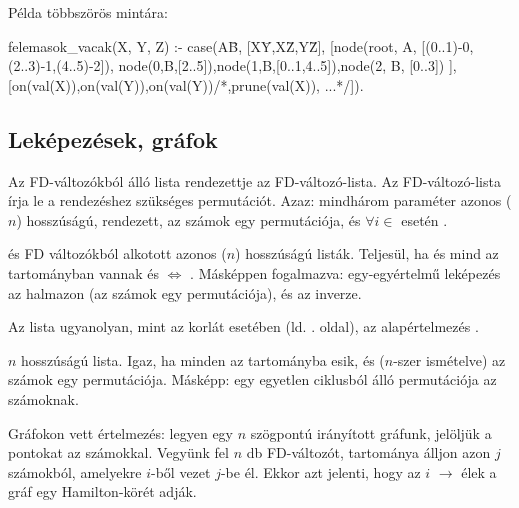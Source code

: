 Példa többszörös mintára: 

\begin{prologcode}
felemasok_vacak(X, Y, Z) :-
    case(A\=B, [X\=Y,X\=Z,Y\=Z],
     [node(root, A, [(0..1)-0,(2..3)-1,(4..5)-2]),
      node(0,B,[2..5]),node(1,B,[0..1,4..5]),node(2, B, [0..3])
     ], [on(val(X)),on(val(Y)),on(val(Y))/*,prune(val(X)), ...*/]).
\end{prologcode}

\subsection{Leképezések, gráfok}

{}

Az  FD-változókból álló lista rendezettje az  FD-változó-lista. Az 
FD-változó-lista írja le a rendezéshez szükséges permutációt. Azaz: mindhárom
paraméter azonos ($n$) hosszúságú,  rendezett,  az  számok
egy permutációja, és $\forall i \in$  esetén .

\medskip

{}

 és  FD változókból alkotott azonos ($n$) hosszúságú listák. Teljesül,
ha  és  mind az  tartományban vannak és 
$\Leftrightarrow$ . Másképpen fogalmazva:  egy-egyértelmű
leképezés az  halmazon (az  számok egy permutációja), és
 az  inverze.

Az  lista ugyanolyan, mint az  korlát
esetében (ld. \pageref{all_distinct}. oldal), az alapértelmezés
.

\medskip

{ }

 $n$ hosszúságú lista. Igaz, ha minden  az 
tartományba esik, és 
($n$-szer ismételve) az  számok egy permutációja. Másképp:  egy
egyetlen ciklusból álló permutációja az  számoknak.

Gráfokon vett értelmezés: legyen egy $n$ szögpontú irányított gráfunk,
jelöljük a pontokat az  számokkal. Vegyünk fel $n$ db FD-változót,
 tartománya álljon azon $j$ számokból, amelyekre $i$-ből vezet $j$-be él.
Ekkor  azt jelenti, hogy az $i$ $\rightarrow$  élek a
gráf egy Hamilton-körét adják.


